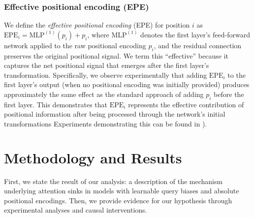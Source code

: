 \documentclass[11pt]{article}
\begin{document}
\subsubsection{Effective positional encoding (EPE)}
We define the \emph{effective positional encoding} (EPE) for position $i$ as $\mathrm{EPE}_i = \mathrm{MLP}^{(1)}(p_i) + p_i$, where $\mathrm{MLP}^{(1)}$ denotes the first layer's feed-forward network applied to the raw positional encoding $p_i$, and the residual connection preserves the original positional signal.  We term this ``effective'' because it captures the net positional signal that emerges after the first layer's transformation. Specifically, we observe experimentally that adding $\mathrm{EPE}_i$ to the first layer's output (when no positional encoding was initially provided) produces approximately the same effect as the standard approach of adding $p_i$ before the first layer. This demonstrates that $\mathrm{EPE}_i$ represents the effective contribution of positional information after being processed through the network's initial transformations Experiments demonstrating this can be found in \label{app:epe_exp}).

\section{Methodology and Results}
First, we state the result of our analysis: a description of the mechanism underlying attention sinks in models with learnable query biases and absolute positional encodings. Then, we provide evidence for our hypothesis through experimental analyses and causal interventions.
\end{document}
